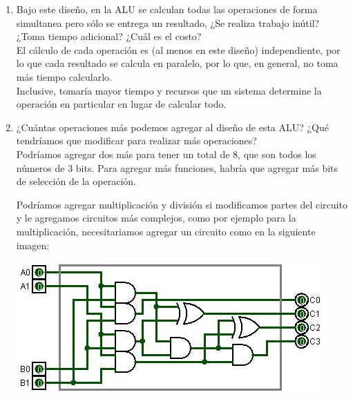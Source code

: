 \documentclass{article}
\begin{document}
\begin{enumerate}
	
		\item
		Bajo este diseño, en la ALU se calculan todas las operaciones de forma
        simultanea pero sólo se entrega un resultado, ¿Se realiza trabajo inútil?
        ¿Toma tiempo adicional? ¿Cuál es el costo?\\
        El cálculo de cada operación es (al menos en este diseño) independiente, 
        por lo que cada resultado se calcula en paralelo, por lo que, en general,
        no toma más tiempo calcularlo.\\
        Inclusive, tomaría mayor tiempo y recursos que un sistema determine la 
        operación en particular en lugar de calcular todo.


		\item
        ¿Cuántas operaciones más podemos agregar al diseño de esta ALU? 
        ¿Qué tendríamos que modificar para realizar más operaciones?\\
        Podríamos agregar dos más para tener un total de 8, que son todos los 
        números de 3 bits. Para agregar más funciones, habría que agregar más
        bits de selección de la operación.

        Podríamos agregar multiplicación y división si modificamos partes del 
        circuito y le agregamos circuitos más complejos, como por ejemplo para 
        la multiplicación, necesitariamos agregar un circuito como en la siguiente 
        imagen:
		
		\includegraphics[scale=0.5]{Multiplicador.jpg}
		          
            
    \end{enumerate}
  
    
    
\end{document}
